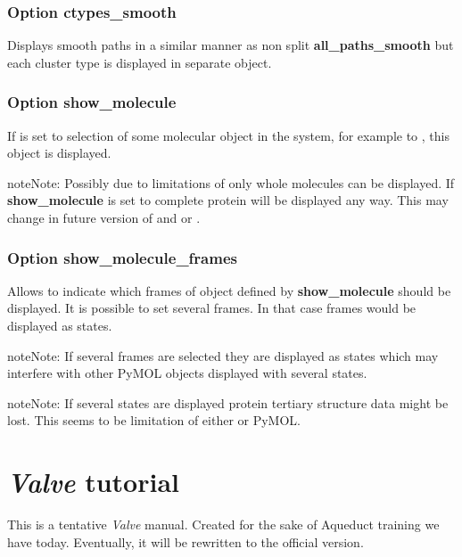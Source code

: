 \documentclass[a4paper,10pt,english]{sphinxmanual}
\begin{document}
\subsection{Option \textbf{ctypes\_smooth}}
\label{valve/valve_config:option-ctypes-smooth}
Displays smooth paths in a similar manner as non split \textbf{all\_paths\_smooth} but each cluster type is displayed in separate object.


\subsection{Option \textbf{show\_molecule}}
\label{valve/valve_config:option-show-molecule}
If is set to selection of some molecular object in the system, for example to , this object is displayed.

\begin{notice}{note}{Note:}
Possibly due to limitations of  only whole molecules can be displayed. If \textbf{show\_molecule} is set to  complete protein will be displayed any way. This may change in future version of  and or {\hyperref[aqueduct:module-aqueduct]{}}.
\end{notice}


\subsection{Option \textbf{show\_molecule\_frames}}
\label{valve/valve_config:option-show-molecule-frames}
Allows to indicate which frames of object defined by \textbf{show\_molecule} should be displayed. It is possible to set several frames. In that case frames would be displayed as states.

\begin{notice}{note}{Note:}
If several frames are selected they are displayed as states which may interfere with other PyMOL objects displayed with several states.
\end{notice}

\begin{notice}{note}{Note:}
If several states are displayed protein tertiary structure data might be lost. This seems to be limitation of either  or PyMOL.
\end{notice}


\chapter{\emph{Valve} tutorial}
\label{valve/valve_tutorial:valve-tutorial}\label{valve/valve_tutorial::doc}
This is a tentative \emph{Valve} manual. Created for the sake of Aqueduct training we have today. Eventually, it will be rewritten to the official version.
\end{document}
